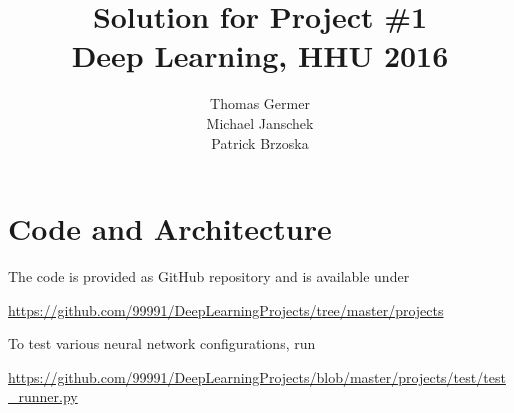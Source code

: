 \documentclass{article}
\title{Solution for Project \#1 \\\large Deep Learning, HHU 2016}
\author{
  Thomas Germer \\
  \And
  Michael Janschek \\
  \And
  Patrick Brzoska \\
}
\begin{document}
\maketitle

\section{Code and Architecture}

The code is provided as GitHub repository and is available under
\begin{center}
	\url{https://github.com/99991/DeepLearningProjects/tree/master/projects}
\end{center}

To test various neural network configurations, run
\begin{center}
	\url{https://github.com/99991/DeepLearningProjects/blob/master/projects/test/test_runner.py}
\end{center}

\newpage
\end{document}
